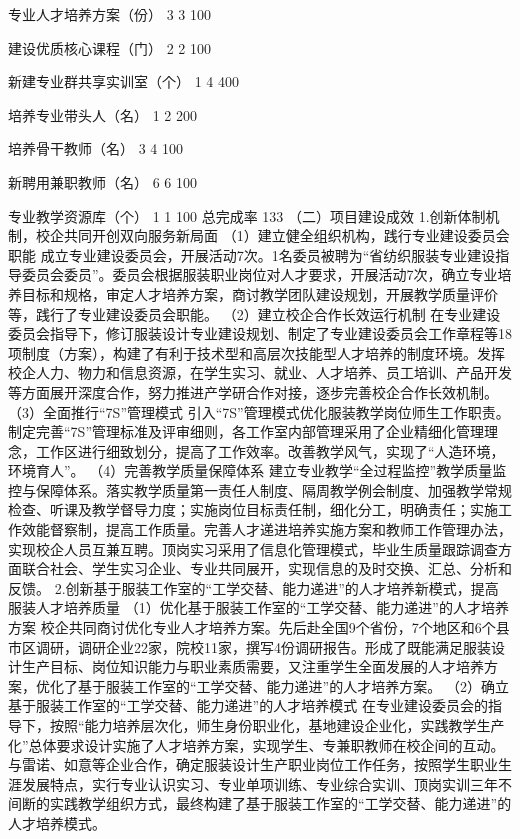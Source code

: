 专业人才培养方案（份）
3
3
100%

建设优质核心课程（门）
2
2
100%

新建专业群共享实训室（个）
1
4
400%

培养专业带头人（名）
1
2
200%

培养骨干教师（名）
3
4
100%

新聘用兼职教师（名）
6
6
100%

专业教学资源库（个）
1
1
100%
总完成率
133%
（二）项目建设成效
1.创新体制机制，校企共同开创双向服务新局面
（1）建立健全组织机构，践行专业建设委员会职能
成立专业建设委员会，开展活动7次。1名委员被聘为“省纺织服装专业建设指导委员会委员”。委员会根据服装职业岗位对人才要求，开展活动7次，确立专业培养目标和规格，审定人才培养方案，商讨教学团队建设规划，开展教学质量评价等，践行了专业建设委员会职能。
（2）建立校企合作长效运行机制
在专业建设委员会指导下，修订服装设计专业建设规划、制定了专业建设委员会工作章程等18项制度（方案），构建了有利于技术型和高层次技能型人才培养的制度环境。发挥校企人力、物力和信息资源，在学生实习、就业、人才培养、员工培训、产品开发等方面展开深度合作，努力推进产学研合作对接，逐步完善校企合作长效机制。
（3）全面推行“7S”管理模式
引入“7S”管理模式优化服装教学岗位师生工作职责。制定完善“7S”管理标准及评审细则，各工作室内部管理采用了企业精细化管理理念，工作区进行细致划分，提高了工作效率。改善教学风气，实现了“人造环境，环境育人”。
（4）完善教学质量保障体系
建立专业教学“全过程监控”教学质量监控与保障体系。落实教学质量第一责任人制度、隔周教学例会制度、加强教学常规检查、听课及教学督导力度；实施岗位目标责任制，细化分工，明确责任；实施工作效能督察制，提高工作质量。完善人才递进培养实施方案和教师工作管理办法，实现校企人员互兼互聘。顶岗实习采用了信息化管理模式，毕业生质量跟踪调查方面联合社会、学生实习企业、专业共同展开，实现信息的及时交换、汇总、分析和反馈。
2.创新基于服装工作室的“工学交替、能力递进”的人才培养新模式，提高服装人才培养质量
（1）优化基于服装工作室的“工学交替、能力递进”的人才培养方案
校企共同商讨优化专业人才培养方案。先后赴全国9个省份，7个地区和6个县市区调研，调研企业22家，院校11家，撰写4份调研报告。形成了既能满足服装设计生产目标、岗位知识能力与职业素质需要，又注重学生全面发展的人才培养方案，优化了基于服装工作室的“工学交替、能力递进”的人才培养方案。
（2）确立基于服装工作室的“工学交替、能力递进”的人才培养模式
在专业建设委员会的指导下，按照“能力培养层次化，师生身份职业化，基地建设企业化，实践教学生产化”总体要求设计实施了人才培养方案，实现学生、专兼职教师在校企间的互动。与雷诺、如意等企业合作，确定服装设计生产职业岗位工作任务，按照学生职业生涯发展特点，实行专业认识实习、专业单项训练、专业综合实训、顶岗实训三年不间断的实践教学组织方式，最终构建了基于服装工作室的“工学交替、能力递进”的人才培养模式。

